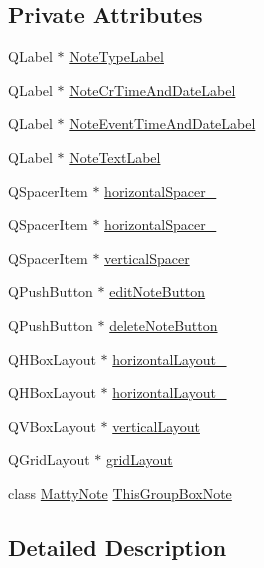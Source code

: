 \subsection*{Private Attributes}
\begin{DoxyCompactItemize}
\item 
Q\+Label $\ast$ \hyperlink{classMattyGroupBox_a7bd564ef71ea2331a316d2fc6792ef09}{Note\+Type\+Label}
\item 
Q\+Label $\ast$ \hyperlink{classMattyGroupBox_a1a71503d5ede703b934e4f02d932a038}{Note\+Cr\+Time\+And\+Date\+Label}
\item 
Q\+Label $\ast$ \hyperlink{classMattyGroupBox_a97b192413385021b01b34db7493f8b49}{Note\+Event\+Time\+And\+Date\+Label}
\item 
Q\+Label $\ast$ \hyperlink{classMattyGroupBox_a2243d04d95c060e516fa3a43f09f19ef}{Note\+Text\+Label}
\item 
Q\+Spacer\+Item $\ast$ \hyperlink{classMattyGroupBox_a6b2678b09a3c56c18f357775e83b76c0}{horizontal\+Spacer\+\_}
\item 
Q\+Spacer\+Item $\ast$ \hyperlink{classMattyGroupBox_a633d989baf5de2db6d0c01702ba6b410}{horizontal\+Spacer\+\_}
\item 
Q\+Spacer\+Item $\ast$ \hyperlink{classMattyGroupBox_ae622d8330b00272995af1d41ce037b4c}{vertical\+Spacer}
\item 
Q\+Push\+Button $\ast$ \hyperlink{classMattyGroupBox_a3237eef2287c1b2fcff14d226ef9116d}{edit\+Note\+Button}
\item 
Q\+Push\+Button $\ast$ \hyperlink{classMattyGroupBox_ab51a570cfe8b06f8ae06a7163fb09d4f}{delete\+Note\+Button}
\item 
Q\+H\+Box\+Layout $\ast$ \hyperlink{classMattyGroupBox_a5d52dd2e01ba1a5d155e056ea438f142}{horizontal\+Layout\+\_}
\item 
Q\+H\+Box\+Layout $\ast$ \hyperlink{classMattyGroupBox_a053f7794bcd10214414d41e9c09663e0}{horizontal\+Layout\+\_}
\item 
Q\+V\+Box\+Layout $\ast$ \hyperlink{classMattyGroupBox_a2fc280283ef68a61828fe26007c949f1}{vertical\+Layout}
\item 
Q\+Grid\+Layout $\ast$ \hyperlink{classMattyGroupBox_a02436c3690d2007eb0cba523bcb668ea}{grid\+Layout}
\item 
class \hyperlink{classMattyNote}{Matty\+Note} \hyperlink{classMattyGroupBox_a00ca2ef39a0b5aca9e83373777bed395}{This\+Group\+Box\+Note}
\end{DoxyCompactItemize}


\subsection{Detailed Description}


